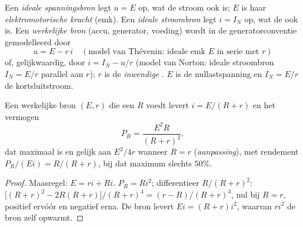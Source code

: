\begin{definition}\label{def:b1:dc-circuits:sources}
Een \emph{ideale spanningsbron} legt $u = E$ op, wat de stroom ook is;
$E$ is haar \emph{elektromotorische kracht} (emk). Een \emph{ideale
stroombron} legt $i = I_N$ op, wat de  ook is. Een \emph{werkelijke
bron} (accu, generator, voeding) wordt in de generatorconventie
gemodelleerd door
\[
u = E - r\,i \quad (\text{model van Thévenin: ideale emk } E \text{ in serie met } r)
\]
of, gelijkwaardig, door $i = I_N - u/r$ (model van Norton: ideale
stroombron $I_N = E/r$ parallel aan $r$); $r$ is de \emph{inwendige
}. $E$ is de nullastspanning en $I_N = E/r$ de
kortsluitstroom.
\end{definition}

\begin{proposition}\label{prop:b1:dc-circuits:sourcepower}
Een werkelijke bron $(E, r)$ die een  $R$ voedt levert $i = E/(R + r)$
en het vermogen
\[
P_R = \frac{E^2 R}{(R + r)^2},
\]
dat maximaal is en gelijk aan $E^2/4r$ wanneer $R = r$ (\emph{aanpassing}),
met rendement $P_R/(Ei) = R/(R + r)$, bij dat maximum slechts $50\%$.
\end{proposition}

\begin{proof}
Maasregel: $E = ri + Ri$. $P_R = Ri^2$; differentieer $R/(R + r)^2$:
$\big[(R + r)^2 - 2R(R + r)\big]/(R + r)^4 = (r - R)/(R + r)^3$, nul bij
$R = r$, positief ervóór en negatief erna. De bron levert
$Ei = (R + r)i^2$, waarvan $ri^2$ de bron zelf opwarmt.
\end{proof}

